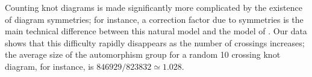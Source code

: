 \documentclass[amsmath,secnumarabic,floatfix,amssymb,nofootinbib,nobibnotes,letterpaper,11pt,tightenlines,showkeys]{revtex4}
\theoremstyle{definition}
\begin{document}
Counting knot diagrams is made significantly more complicated by the existence of diagram symmetries; for instance, a correction factor due to symmetries is the main technical difference between this natural model and the model of \cite{Schaeffer:2004tt}. Our data shows that this difficulty rapidly disappears as the number of crossings increases; the average size of the automorphism group for a random 10 crossing knot diagram, for instance, is $846929/823832 \simeq 1.028$. 

%
\end{document}
